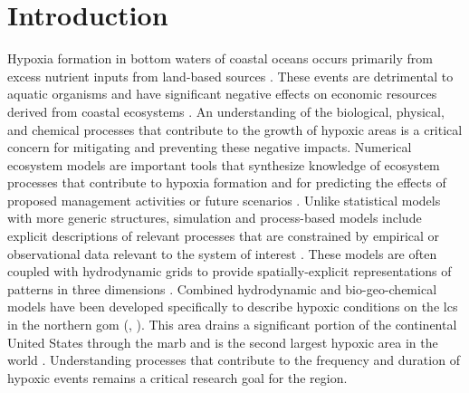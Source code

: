 \documentclass[preprint]{elsarticle}\usepackage[]{graphicx}\usepackage[]{color}
\begin{document}
\linenumbers
\acresetall

\section{Introduction}

Hypoxia formation in bottom waters of coastal oceans occurs primarily from excess nutrient inputs from land-based sources \citep{Justic87,Diaz95,Howarth96}.  These events are detrimental to aquatic organisms and have significant negative effects on economic resources derived from coastal ecosystems \citep{Lipton03,Diaz11}.  An understanding of the biological, physical, and chemical processes that contribute to the growth of hypoxic areas is a critical concern for mitigating and preventing these negative impacts.  Numerical ecosystem models are important tools that synthesize knowledge of ecosystem processes that contribute to hypoxia formation and for predicting the effects of proposed management activities or future scenarios \citep{Scavia04,Hagy07,Pauer16}.  Unlike statistical models with more generic structures, simulation and process-based models include explicit descriptions of relevant processes that are constrained by empirical or observational data relevant to the system of interest \citep[e.g.][]{Omlin01b,Eldridge10}.  These models are often coupled with hydrodynamic grids to provide spatially-explicit representations of patterns in three dimensions \citep{Warner05,Zhao10,Ganju16}. Combined hydrodynamic and bio-geo-chemical models have been developed specifically to describe hypoxic conditions on the \ac{lcs} in the northern \ac{gom} (\citealt{Fennel13,Obenour15,Pauer16}, ).  This area drains a significant portion of the continental United States through the \ac{marb} and is the second largest hypoxic area in the world \citep{Rabalais02}.  Understanding processes that contribute to the frequency and duration of hypoxic events remains a critical research goal for the region.  
\end{document}
